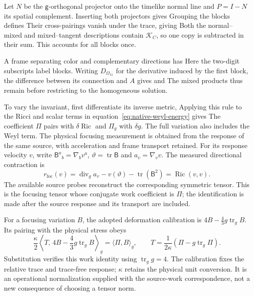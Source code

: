 Let $N$ be the $\mathsf g$-orthogonal projector onto the timelike normal line and $P=I-N$ its spatial complement. Inserting both projectors gives
\EnergyProjectionExampleDisplay
Grouping the blocks defines
\NativePacketsDisplay
Their cross-pairings vanish under the trace, giving
\NativeEnergyAllocationDisplay
Both the normal--mixed and mixed--tangent descriptions contain $\mathcal K_C$, so one copy is subtracted in their sum. This accounts for all blocks once.

A frame separating color and complementary directions has
\SpectrumFullCurvatureDisplay
Here the two-digit subscripts label blocks. Writing $D_{\Omega_{11}}$ for the derivative induced by the first block, the difference between its connection and $A$ gives
\SpectrumMixedCorrectionDisplay
and
\EnergyColorCorrectionDisplay
The mixed products thus remain before restricting to the homogeneous solution.

To vary the invariant, first differentiate its inverse metric,
\EnergyInverseMetricDisplay
Applying this rule to the Ricci and scalar terms in equation~\eqref{eq:native-weyl-energy} gives
\NativeWorkCoefficientsDisplay
The coefficient $\Pi$ pairs with $\delta\operatorname{Ric}$ and $\Pi_g$ with $\delta g$. The full variation also includes the Weyl term. The physical focusing measurement is obtained from the response of the same source, with acceleration and frame transport retained. For its response velocity $v$, write $\mathsf B^a{}_b=\nabla_bv^a$, $\vartheta=\operatorname{tr}\mathsf B$ and $a_v=\nabla_vv$. The measured directional contraction is
\[
r_{\mathrm{foc}}(v)=\operatorname{div}_g a_v-v(\vartheta)-\operatorname{tr}(\mathsf B^2)
=\operatorname{Ric}(v,v).
\]
The available source probes reconstruct the corresponding symmetric tensor. This is the focusing tensor whose conjugate work coefficient is $\Pi$; the identification is made after the source response and its transport are included.

For a focusing variation $B$, the adopted deformation calibration is $4B-\tfrac43g\operatorname{tr}_gB$. Its pairing with the physical stress obeys
\[
\frac{\kappa}{2}
\left\langle T,\,4B-\frac43g\operatorname{tr}_gB\right\rangle_g
=\langle\Pi,B\rangle_g,\qquad
T=\frac1{2\kappa}\left(\Pi-g\operatorname{tr}_g\Pi\right).
\]
Substitution verifies this work identity using $\operatorname{tr}_g g=4$. The calibration fixes the relative trace and trace-free response; $\kappa$ retains the physical unit conversion. It is an operational normalization supplied with the source-work correspondence, not a new consequence of choosing a tensor norm.

